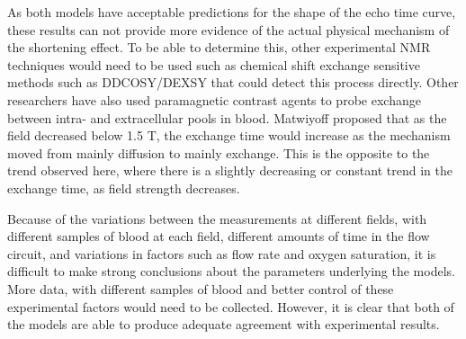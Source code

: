 As both models have acceptable predictions for the shape of the echo time curve, these results can not provide more evidence of the actual physical mechanism of the \Ttwo shortening effect.
To be able to determine this, other experimental NMR techniques would need to be used such as chemical shift exchange sensitive methods such as DDCOSY/DEXSY that could detect this process directly.
Other researchers have also used paramagnetic contrast agents to probe exchange between intra- and extracellular pools in blood\cite{LiIntegratedanalysisdiffusion1998}.
Matwiyoff \cite{Matwiyofflineshapeswater1990} proposed that as the field decreased below 1.5 T, the exchange time would increase as the mechanism moved from mainly diffusion to mainly exchange.
This is the opposite to the trend observed here, where there is a slightly decreasing or constant trend in the exchange time, as field strength decreases.

Because of the variations between the measurements at different fields, with different samples of blood at each field, different amounts of time in the flow circuit, and variations in factors such as flow rate and oxygen saturation, it is difficult to make strong conclusions about the parameters underlying the models.
More data, with different samples of blood and better control of these experimental factors would need to be collected.
However, it is clear that both of the models are able to produce adequate agreement with experimental results.
